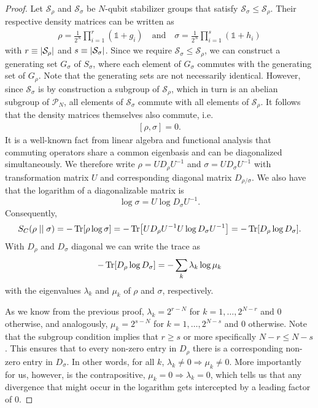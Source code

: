 \begin{proof}
   Let $\mathcal{S}_\rho$ and $\mathcal{S}_\sigma$ be $N$-qubit stabilizer
   groups that satisfy $\mathcal{S}_\sigma \leq \mathcal{S}_\rho$. Their
   respective density matrices can be written as
   \begin{align}
     \rho = \frac{1}{2^N} \prod_{i=1}^r (\mathds{1} + g_i) \quad{\text{and}}
       \quad \sigma = \frac{1}{2^N} \prod_{i=1}^s (\mathds{1} + h_i)
   \end{align}
   with $r \equiv \abs{\mathcal{S}_\rho}$ and $s \equiv
   \abs{\mathcal{S}_\sigma}$. Since we require $\mathcal{S}_\sigma \leq
   \mathcal{S}_\rho$, we can construct a generating set $G_\sigma$ of
   $S_\sigma$, where each element of $G_\sigma$ commutes with the generating
   set of $G_\rho$. Note that the generating sets are not necessarily
   identical. However, since $\mathcal{S}_\sigma$ is by construction a subgroup
   of $\mathcal{S}_\rho$, which in turn is an abelian subgroup of
   $\mathcal{P}_N$, all elements of $\mathcal{S}_\sigma$ commute with all elements of
   $\mathcal{S}_\rho$. It follows that the density matrices themselves also
   commute, i.e.
   \begin{align}
      \left[\rho, \sigma\right] = 0
   .\end{align}
   It is a well-known fact from linear algebra and functional analysis that
   commuting operators share a common eigenbasis and can be diagonalized
   simultaneously. We therefore write $\rho = UD_\rho U^{-1}$ and $\sigma =
   UD_\sigma U^{-1}$ with transformation matrix $U$ and corresponding diagonal
   matrix $D_{\rho / \sigma}$. We also have that the logarithm of a diagonalizable
   matrix is \cite{hallElementaryIntroductionGroups2000}
   $$\log \sigma = U \log D_\sigma U^{-1}.$$ Consequently,
   \begin{align}
      S_C(\rho\mid\mid\sigma) = -\Tr[\rho \log\sigma] = -\Tr[U D_\rho U^{-1} U \log D_\sigma U^{-1}] =
      -\Tr[D_\rho \log D_\sigma] 
   .\end{align}
   With $D_\rho$ and $D_\sigma$ diagonal we can write the trace as
   \begin{align}\label{eq:the-sum}
      -\Tr[D_\rho \log D_\sigma] = -\sum_k \lambda_k \log \mu_k
   \end{align}
   with the eigenvalues $\lambda_k$ and $\mu_k$ of $\rho$ and $\sigma$,
   respectively.

   As we know from the previous proof, $\lambda_k = 2^{r-N}$ for
   $k=1,\ldots,2^{N-r}$ and $0$ otherwise, and analogously, $\mu_k = 2^{s-N}$
   for $k=1,\ldots,2^{N-s}$ and $0$ otherwise. Note that the subgroup condition
   implies that $r\geq s$ or more specifically $N-r \leq N-s$. This ensures that to every non-zero entry in
   $D_\rho$ there is a corresponding non-zero entry in $D_\sigma$. In other
   words, for all $k$, $\lambda_k \neq 0 \Rightarrow \mu_k \neq 0$. More
   importantly for us, however, is the contrapositive, $\mu_k = 0 \Rightarrow
   \lambda_k = 0$, which tells us that any divergence that might occur
   in the logarithm gets intercepted by a leading factor of $0$.


\end{proof}
